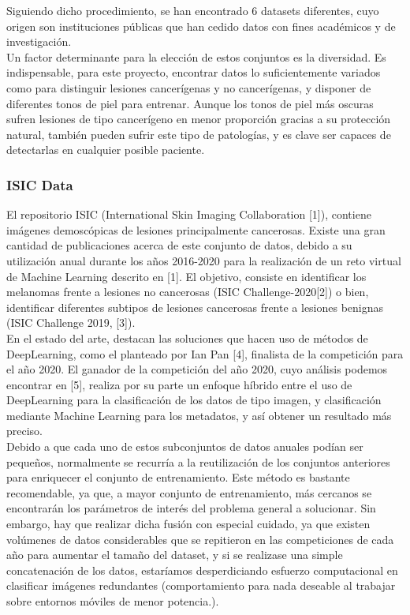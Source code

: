 Siguiendo dicho procedimiento, se han encontrado 6 datasets diferentes, cuyo origen son instituciones públicas que han cedido datos con fines académicos y de investigación.\\

Un factor determinante para la elección de estos conjuntos es la diversidad. Es indispensable, para este proyecto, encontrar datos lo suficientemente variados como para distinguir lesiones cancerígenas y no cancerígenas, y disponer de diferentes tonos de piel para entrenar. Aunque los tonos de piel más oscuras sufren lesiones de tipo cancerígeno en menor proporción gracias a su protección natural, también pueden sufrir este tipo de patologías, y es clave ser capaces de detectarlas en cualquier posible paciente.

\subsubsection{ISIC Data}
El repositorio ISIC (International Skin Imaging Collaboration [1]), contiene imágenes demoscópicas de lesiones principalmente cancerosas.  Existe una gran cantidad de publicaciones acerca de este conjunto de datos, debido a su utilización anual durante los años 2016-2020 para la realización de un reto virtual de Machine Learning descrito en [1]. El objetivo, consiste en identificar los melanomas frente a lesiones no cancerosas (ISIC Challenge-2020[2]) o bien, identificar diferentes subtipos de lesiones cancerosas frente a lesiones benignas (ISIC Challenge 2019, [3]). \\

En el estado del arte, destacan las soluciones que hacen uso de métodos de DeepLearning, como el planteado por Ian Pan [4], finalista de la competición para el año 2020. El ganador de la competición del año 2020, cuyo análisis podemos encontrar en [5], realiza por su parte un enfoque híbrido entre el uso de DeepLearning para la clasificación de los datos de tipo imagen, y clasificación mediante Machine Learning para los metadatos, y así obtener un resultado más preciso. \\

Debido a que cada uno de estos subconjuntos de datos anuales podían ser pequeños, normalmente se recurría a la reutilización de los conjuntos anteriores para enriquecer el conjunto de entrenamiento.  Este método es bastante recomendable, ya que, a mayor conjunto de entrenamiento, más cercanos se encontrarán los parámetros de interés del problema general a solucionar. Sin embargo, hay que realizar dicha fusión con especial cuidado, ya que existen volúmenes de datos considerables que se repitieron en las competiciones de cada año para aumentar el tamaño del dataset, y si se realizase una simple concatenación de los datos, estaríamos desperdiciando esfuerzo computacional en clasificar imágenes redundantes (comportamiento para nada deseable al trabajar sobre entornos móviles de menor potencia.).\\

